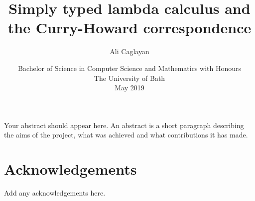 \documentclass{article}
\title{Simply typed lambda calculus and the Curry-Howard correspondence}
\author{Ali Caglayan}
\date{Bachelor of Science in Computer Science and Mathematics with Honours\\The University of Bath\\May 2019}
\theoremstyle{definition}
\begin{document}
%
\setcounter{page}{0}


\maketitle
\newpage


\newpage

\newpage

{\abstract
Your abstract should appear here.  An abstract is a short
paragraph describing the aims of the project, what was
achieved and what contributions it has made.
}
\newpage
\tableofcontents
\newpage

\chapter*{Acknowledgements}
Add any acknowledgements here.
\newpage

\setcounter{page}{1}














\end{document}

